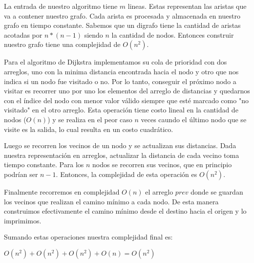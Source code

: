 La entrada de nuestro algoritmo tiene $m$ lineas. Estas representan las aristas que va a contener nuestro grafo. Cada arista es procesada y almacenada en nuestro grafo en tiempo constante. Sabemos que un digrafo tiene la cantidad de aristas acotadas por $n*(n-1)$ siendo $n$ la cantidad de nodos. Entonces construir nuestro grafo tiene una complejidad de $O(n^2)$.

Para el algoritmo de Dijkstra implementamos su cola de prioridad con dos arreglos, uno con la minima distancia encontrada hacia el nodo y otro que nos indica si un nodo fue visitado o no. Por lo tanto, conseguir el próximo nodo a visitar es recorrer uno por uno los elementos del arreglo de distancias y quedarnos con el índice del nodo con menor valor válido siempre que esté marcado como "no visitado" en el otro arreglo. Esta operación tiene costo lineal en la cantidad de nodos ($O(n)$) y se realiza en el peor caso $n$ veces caundo el último nodo que se visite es la salida, lo cual resulta en un costo cuadrático. 

Luego se recorren los vecinos de un nodo y se actualizan sus distancias. Dada nuestra representación en arreglos, actualizar la distancia de cada vecino toma tiempo constante. Para los $n$ nodos se recorren sus vecinos, que en principio podrían ser $n-1$. Entonces, la complejidad de esta operación es $O(n^2)$.

Finalmente recorremos en complejidad $O(n)$ el arreglo $prev$ donde se guardan los vecinos que realizan el camino mínimo a cada nodo. De esta manera construimos efectivamente el camino mínimo desde el destino hacia el origen y lo imprimimos. 

Sumando estas operaciones nuestra complejidad final es:

$O(n^2) + O(n^2) + O(n^2) + O(n) = O(n^2)$